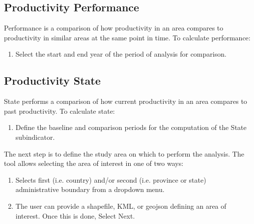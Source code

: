 \documentclass[letterpaper,10pt,english]{sphinxmanual}
\begin{document}


\subsection{Productivity Performance}
\label{\detokenize{Qgis_Plugin/Calculate_sdg15:productivity-performance}}
\sphinxAtStartPar
Performance is a comparison of how productivity in an area compares to
productivity in similar areas at the same point in time. To calculate
performance:
\begin{enumerate}
%
\item {} 
\sphinxAtStartPar
Select the start and end year of the period of analysis  for comparison.

\end{enumerate}


\subsection{Productivity State}
\label{\detokenize{Qgis_Plugin/Calculate_sdg15:productivity-state}}
\sphinxAtStartPar
State performs a comparison of how current productivity in an area compares to
past productivity. To calculate state:
\begin{enumerate}
%
\item {} 
\sphinxAtStartPar
Define the baseline and comparison periods for the computation of the State
sub\sphinxhyphen{}indicator.

\end{enumerate}

\sphinxAtStartPar
The next step is to define the study area on which to perform the analysis. The
tool allows selecting the area of interest in one of two ways:
\begin{enumerate}
%
\item {} 
\sphinxAtStartPar
Selects first (i.e. country) and/or second (i.e. province or state)
administrative boundary from a drop\sphinxhyphen{}down menu.

\item {} 
\sphinxAtStartPar
The user can provide a shapefile, KML, or geojson defining an area of
interest. Once this is done, Select Next.

\end{enumerate}
\end{document}
